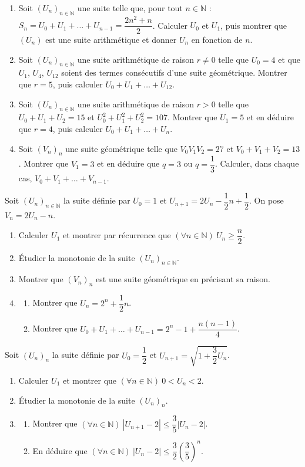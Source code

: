 \fin
{}
\begin{enumerate}
\item Soit $(U_n)_{n\in\mathbb{N}}$ une suite telle que, pour tout $n\in\mathbb{N}$ : $S_n=U_0+U_1+\dots+U_{n-1}=\dfrac{2n^2+n}{2}$.
Calculer $U_0$ et $U_1$, puis montrer que $(U_n)$ est une suite arithmétique et donner $U_n$ en fonction de $n$.
\item Soit $(U_n)_{n\in\mathbb{N}}$ une suite arithmétique de raison $r\neq0$ telle que $U_0=4$ et que $U_1$, $U_4$, $U_{12}$ soient des termes consécutifs d'une suite géométrique.
Montrer que $r=5$, puis calculer $U_0+U_1+\dots+U_{12}$.
\item Soit $(U_n)_{n\in\mathbb{N}}$ une suite arithmétique de raison $r>0$ telle que $U_0+U_1+U_2=15$ et $U_0^2+U_1^2+U_2^2=107$.
Montrer que $U_1=5$ et en déduire que $r=4$, puis calculer $U_0+U_1+\dots+U_n$.
\item Soit $(V_n)_n$ une suite géométrique telle que $V_0V_1V_2=27$ et $V_0+V_1+V_2=13$.
Montrer que $V_1=3$ et en déduire que $q=3$ ou $q=\dfrac13$. Calculer, dans chaque cas, $V_0+V_1+\dots+V_{n-1}$.
\end{enumerate}
\fin
{}
Soit $(U_n)_{n\in\mathbb{N}}$ la suite définie par $U_0=1$ et $U_{n+1}=2U_n-\dfrac12n+\dfrac12$. On pose $V_n=2U_n-n$.
\begin{enumerate}
\item Calculer $U_1$ et montrer par récurrence que $(\forall n\in\mathbb{N})\ U_n\geq\dfrac n2$.
\item Étudier la monotonie de la suite $(U_n)_{n\in\mathbb{N}}$.
\item Montrer que $(V_n)_n$ est une suite géométrique en précisant sa raison.
\item \begin{enumerate}
\item Montrer que $U_n=2^n+\dfrac12n$.
\item Montrer que $U_0+U_1+\dots+U_{n-1}=2^n-1+\dfrac{n(n-1)}{4}$.
\end{enumerate}
\end{enumerate}
\fin
Soit $(U_n)_n$ la suite définie par $U_0=\dfrac12$ et $U_{n+1}=\sqrt{1+\dfrac32U_n}$.
\begin{enumerate}
\item Calculer $U_1$ et montrer que $(\forall n\in\mathbb{N})\ 0<U_n<2$.
\item Étudier la monotonie de la suite $(U_n)_n$.
\item \begin{enumerate}
\item Montrer que $(\forall n\in\mathbb{N})\ |U_{n+1}-2|\leq\dfrac35|U_n-2|$.
\item En déduire que $(\forall n\in\mathbb{N})\ |U_n-2|\leq\dfrac32\left(\dfrac35\right)^n$.
\end{enumerate}
\end{enumerate}
\fin
